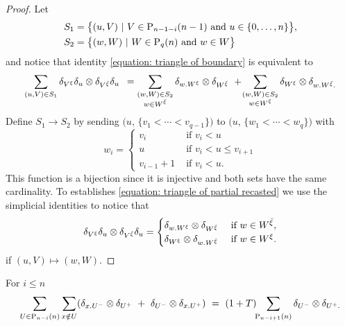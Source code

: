 \begin{proof}
	Let
	\begin{align*}
	& S_1 = \big\{(u, V)\ |\ V \in \P_{n-1-i}(n-1) \text{ and }  u \in \{0, \dots, n \} \big\}, \\
	& S_2 = \big\{(w, W)\ |\ W \in \P_{q}(n) \text{ and } w \in W \big\}
	\end{align*}
	and notice that identity \eqref{equation: triangle of boundary} is equivalent to
	\begin{equation} \label{equation: triangle of partial recasted}
	\sum_{(u, V) \in S_1} \delta_{V^\xi}\delta_u \otimes \delta_{V^{\bar{\xi}}}\delta_u \ \, =
	\sum_{\substack{(w, W) \in S_2 \\ w \in W^{\bar{\xi}}}} \delta_{w.W^\xi} \tensor \delta_{W^{\bar{\xi}}} \ + \!
	\sum_{\substack{(w, W) \in S_2 \\ w \in W^\xi}} \delta_{W^\xi} \tensor \delta_{w.W^{\bar{\xi}}.}
	\end{equation}
	Define $S_1 \to S_2$ by sending $\big(u, \, \{v_1 < \cdots < v_{q-1}\} \big)$ to $\big(u,\, \{w_1 < \cdots < w_{q}\} \big)$ with
	\[
	w_i =
	\begin{cases}
	v_i & \text{ if } v_i < u \\
	u & \text{ if } v_i < u \leq v_{i+1} \\
	v_{i-1}+1 & \text{ if } v_i < u.
	\end{cases}
	\]
	This function is a bijection since it is injective and both sets have the same cardinality. To establishes \eqref{equation: triangle of partial recasted} we use the simplicial identities to notice that
	\[
	\delta_{V^\xi} \delta_u \otimes \delta_{V^{\bar{\xi}}} \delta_u =
	\begin{cases}
	\delta_{w.W^\xi} \tensor \delta_{W^{\bar{\xi}}} & \text{ if } w \in W^{\bar{\xi}}, \\
	\delta_{W^\xi} \tensor \delta_{w.W^{\bar{\xi}}} & \text{ if } w \in W^\xi.
	\end{cases}
	\]
	if $(u, V) \mapsto (w, W)$.
\end{proof}

\begin{lemma} \label{lemma: boundary gives the lower case}
	For $i \leq n$
	\begin{equation} \label{lemma4: existence: eq1}
	\sum_{U \in \P_{n-i}(n)} \sum_{x \notin U} (\delta_{x.U^-} \tensor \delta_{U^+}\ +\ \delta_{U^-} \tensor \delta_{x.U^+})\ = \
	(1+T) \!\! \sum_{\P_{n-i+1}(n)} \delta_{U^-} \tensor \delta_{U^+.}
	\end{equation}
\end{lemma}

